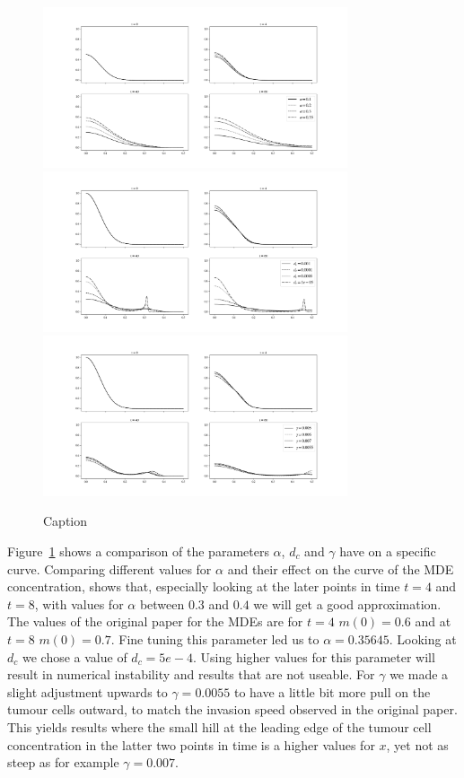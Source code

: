 \begin{figure}[h!]
    \centering
    \includegraphics[width=0.8\textwidth]{resources/images/alpha_comparison.png}
    \includegraphics[width=0.8\textwidth]{resources/images/dc_comparison.png}
    \includegraphics[width=0.8\textwidth]{resources/images/gamma_comparison.png}
    \caption{Caption}
    \label{fig:replication_comparison}
\end{figure}


Figure~\ref{fig:replication_comparison} shows a comparison of the parameters $\alpha$, $d_c$ and $\gamma$ have on a specific curve. Comparing different values for $\alpha$ and their effect on the curve of the MDE concentration, shows that, especially looking at the later points in time $t=4$ and $t=8$, with values for $\alpha$ between $0.3$ and $0.4$ we will get a good approximation. The values of the original paper for the MDEs are for $t=4$ $m(0)=0.6$ and at $t=8$ $m(0)=0.7$. Fine tuning this parameter led us to $\alpha=0.35645$.\newline 
Looking at $d_c$ we chose a value of $d_c=5e-4$. Using higher values for this parameter will result in numerical instability and results that are not useable. For $\gamma$ we made a slight adjustment upwards to $\gamma=0.0055$ to have a little bit more pull on the tumour cells outward, to match the invasion speed observed in the original paper. This yields results where the small hill at the leading edge of the tumour cell concentration in the latter two points in time is a higher values for $x$, yet not as steep as for example $\gamma = 0.007$. \newline

